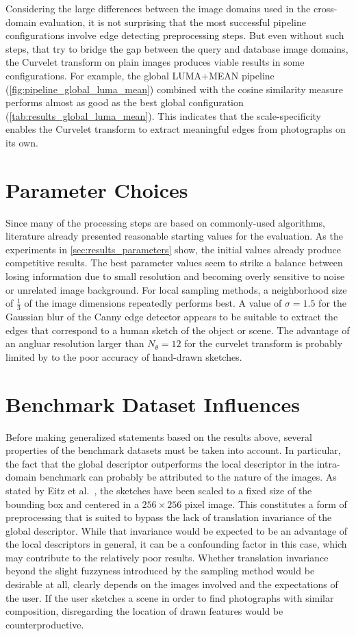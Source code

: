 Considering the large differences between the image domains used in the
cross-domain evaluation, it is not surprising that the most successful pipeline
configurations involve edge detecting preprocessing steps. But even without
such steps, that try to bridge the gap between the query and database image
domains, the Curvelet transform on plain images produces viable results in some
configurations. For example, the global LUMA+MEAN pipeline
(\autoref{fig:pipeline_global_luma_mean}) combined with the cosine
similarity measure performs almost as good as the best global configuration
(\autoref{tab:results_global_luma_mean}). This indicates that the
scale-specificity enables the Curvelet transform to extract meaningful edges
from photographs on its own.

\section{Parameter Choices}

Since many of the processing steps are based on commonly-used algorithms,
literature already presented reasonable starting values for the evaluation. As
the experiments in \autoref{sec:results_parameters} show, the initial
values already produce competitive results. The best parameter values seem to
strike a balance between losing information due to small resolution and
becoming overly sensitive to noise or unrelated image background. For local
sampling methods, a neighborhood size of $\frac{1}{3}$ of the image dimensions
repeatedly performs best. A value of $\sigma=1.5$ for the Gaussian blur of the
Canny edge detector appears to be suitable to extract the edges that correspond
to a human sketch of the object or scene. The advantage of an angluar
resolution larger than $N_{\theta}=12$ for the curvelet transform is probably
limited by to the poor accuracy of hand-drawn sketches.

\section{Benchmark Dataset Influences}

Before making generalized statements based on the results above, several
properties of the benchmark datasets must be taken into account. In particular,
the fact that the global descriptor outperforms the local descriptor in the
intra-domain benchmark can probably be attributed to the nature of the images.
As stated by Eitz et al.\ \autocite{eitz_how_2012}, the sketches have been
scaled to a fixed size of the bounding box and centered in a $256 \times 256$
pixel image. This constitutes a form of preprocessing that is suited to bypass
the lack of translation invariance of the global descriptor. While that
invariance would be expected to be an advantage of the local descriptors in
general, it can be a confounding factor in this case, which may contribute to
the relatively poor results. Whether translation invariance beyond the
slight fuzzyness introduced by the sampling method would be desirable at all,
clearly depends on the images involved and the expectations of the user. If the
user sketches a scene in order to find photographs with similar composition,
disregarding the location of drawn features would be counterproductive.

